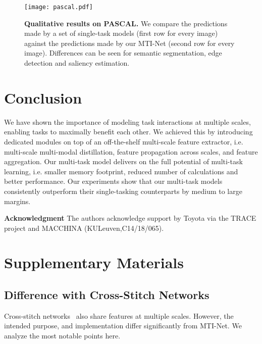 \documentclass[runningheads]{llncs}
\begin{document}
\begin{figure}[t]
\centering
\texttt{[image: pascal.pdf]}
\caption{\textbf{Qualitative results on PASCAL.} We compare the predictions made by a set of single-task models (first row for every image) against the predictions made by our MTI-Net (second row for every image). Differences can be seen for semantic segmentation, edge detection and saliency estimation.}
\label{fig: results_pascal}
\end{figure}

\section{Conclusion}
We have shown the importance of modeling task interactions at multiple scales, enabling tasks to maximally benefit each other. We achieved this by introducing dedicated modules on top of an off-the-shelf multi-scale feature extractor, i.e. multi-scale multi-modal distillation, feature propagation across scales, and feature aggregation. Our multi-task model delivers on the full potential of multi-task learning, i.e. smaller memory footprint, reduced number of calculations and better performance. Our experiments show that our multi-task models consistently outperform their single-tasking counterparts by medium to large margins.

\textbf{Acknowledgment} The authors acknowledge support by Toyota via the TRACE project and MACCHINA (KULeuven,C14/18/065).

\clearpage

\setcounter{section}{0}
\renewcommand\thesection{\Alph{section}}
\setcounter{figure}{0}
\setcounter{table}{0}
\renewcommand{\thefigure}{S\arabic{figure}}
\renewcommand{\thetable}{S\arabic{table}}
\section{Supplementary Materials}
\subsection{Difference with Cross-Stitch Networks}
Cross-stitch networks~\cite{misra2016cross} also share features at multiple scales. However, the intended purpose, and implementation differ significantly from MTI-Net. We analyze the most notable points here.
\end{document}
